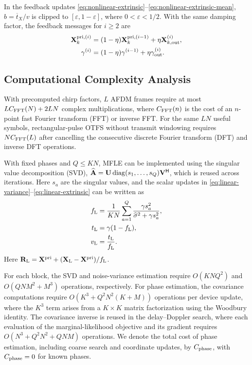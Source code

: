 In the feedback updates
\eqref{eq:nonlinear-extrinsic}--\eqref{eq:nonlinear-extrinsic-mean},
$b=\overline t_X/v$ is clipped to $[\varepsilon,1-\varepsilon]$,
where $0<\varepsilon<1/2$.
With the same damping factor, the feedback messages for $i\geq2$ are
\begin{align}
 \mathbf X_k^{{\rm pri},(i)}
 &=(1-\eta)\mathbf X_k^{{\rm pri},(i-1)}+\eta \mathbf X_{k,\rm out}^{(i)},
 \label{eq:output-damping}\\
 \gamma^{(i)}
 &=(1-\eta)\gamma^{(i-1)}+\eta\gamma_{\rm out}^{(i)}.
 \label{eq:output-variance-damping}
\end{align}

\subsection{Computational Complexity Analysis}
\label{sec:complexity}

With precomputed chirp factors, $L$ AFDM frames require at most
$LC_{\rm FFT}(N)+2LN$ complex multiplications, where $C_{\rm FFT}(n)$ is the cost of an
$n$-point fast Fourier transform (FFT) or inverse FFT. For the same $LN$ useful symbols,
rectangular-pulse OTFS \cite{zou2021otfs} without transmit windowing requires
$NC_{\rm FFT}(L)$ after cancelling the consecutive discrete Fourier transform (DFT)
and inverse DFT operations.


With fixed phases and $Q\leq KN$, MFLE can be implemented using the
singular value decomposition (SVD),
$\widehat{\mathbf A}=\mathbf U\operatorname{diag}(s_1,\ldots,s_Q)\mathbf V^{\mathsf H}$,
which is reused across iterations. Here $s_a$ are the singular values,
and the scalar updates in
\eqref{eq:linear-variance}--\eqref{eq:linear-extrinsic} can be written as
\begin{align}
 f_{\rm L}&=\frac{1}{KN}\sum_{a=1}^{Q}
 \frac{\gamma s_a^2}{\widehat\sigma^2+\gamma s_a^2},
 \label{eq:linear-fraction}\\
 t_{\rm L}&=\gamma(1-f_{\rm L}),
 \label{eq:linear-svd-variance}\\
 v_{\rm L}&=\frac{t_{\rm L}}{f_{\rm L}}.
 \label{eq:linear-svd-extrinsic}
\end{align}
Here $\mathbf R_{\rm L}=\mathbf X^{\rm pri} +(\mathbf X_{\rm L}-\mathbf
X^{\rm pri})/f_{\rm L}$.

For each block, the SVD and noise-variance estimation require
$O(KNQ^2)$ and $O(QNM^2+M^3)$ operations, respectively.
For phase estimation, the covariance computations require
$O(K^3+Q^2N^2(K+M))$ operations per device update, where the
$K^3$ term arises from a $K\times K$ matrix factorization using
the Woodbury identity. The covariance inverse is reused in the
delay--Doppler search, where each evaluation of the marginal-likelihood
objective and its gradient requires $O(N^3+Q^2N^2+QNM)$ operations.
We denote the total cost of phase estimation, including coarse search
and coordinate updates, by $C_{\rm phase}$, with
$C_{\rm phase}=0$ for known phases.

